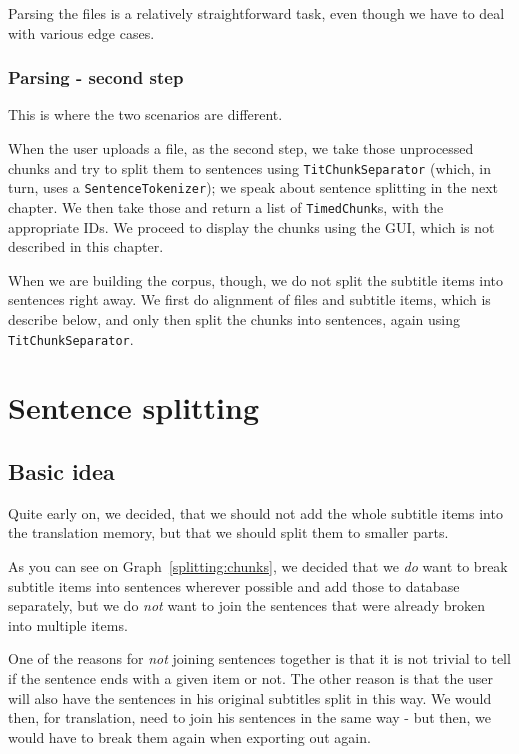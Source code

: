 Parsing the files is a relatively straightforward task, even though we have to deal with various edge cases.

\subsubsection*{Parsing - second step}
This is where the two scenarios are different. 

When the user uploads a file, as the second step, we take those unprocessed chunks and try to split them to sentences using \texttt{TitChunkSeparator} (which, in turn, uses a \texttt{SentenceTokenizer}); we speak about sentence splitting in the next chapter. We then take those and return a list of \texttt{TimedChunk}s, with the appropriate IDs. We proceed to display the chunks using the GUI, which is not described in this chapter.

When we are building the corpus, though, we do not split the subtitle items into sentences right away. We first do alignment of files and subtitle items, which is describe below, and only then split the chunks into sentences, again using \texttt{TitChunkSeparator}.

\section{Sentence splitting}
\label{sentence_splitting}
\subsection*{Basic idea}
Quite early on, we decided, that we should not add the whole subtitle items into the translation memory, but that we should split them to smaller parts.

As you can see on Graph~\ref{splitting:chunks}, we decided that we \emph{do} want to break subtitle items into sentences wherever possible and add those to database separately, but we do \emph{not} want to join the sentences that were already broken into multiple items.

One of the reasons for \emph{not} joining sentences together is that it is not trivial to tell if the sentence ends with a given item or not. The other reason is that the user will also have the sentences in his original subtitles split in this way. We would then, for translation, need to join his sentences in the same way - but then, we would have to break them again when exporting out again.

